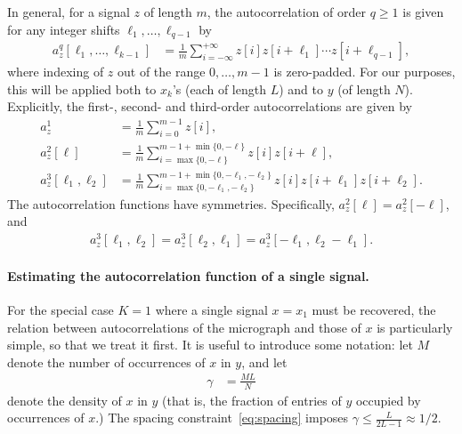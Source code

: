 \documentclass[english,11pt]{article}
\newcommand{\1}{\mathbf{1}}
\newcommand{\TODO}[1]{{\color{red}{[#1]}}}
\numberwithin{equation}{section}
\theoremstyle{plain}
\theoremstyle{definition}
\theoremstyle{remark}
\theoremstyle{plain}
\theoremstyle{remark}
\theoremstyle{plain}
\theoremstyle{plain}
\begin{document}
In general, for a signal $z$ of length $m$, the autocorrelation of order $q \geq 1$ is given for any integer shifts $\ell_1, \ldots, \ell_{q-1}$ by
\begin{align}
a_z^q[\ell_1,\ldots,\ell_{k-1}]  & = \frac{1}{m} \sum_{i=-\infty}^{+\infty} z[i]z[i+\ell_1]\cdots z[i+\ell_{q-1}],
\label{eq:ac_general}
\end{align}
where indexing of $z$ out of the range $0, \ldots, m-1$ is zero-padded.
For our purposes, this will be applied both to $x_k$'s (each of length $L$) and to $y$ (of length $N$).
Explicitly, the first-, second- and third-order autocorrelations are given by
\begin{align} 
a_z^1 & = \frac{1}{m} \sum_{i=0}^{m-1} z[i], \nonumber\\
a_z^2[\ell] & = \frac{1}{m} \sum_{i = \max\{0, -\ell\}}^{m-1 + \min\{0, -\ell\}} z[i]z[i+\ell], \nonumber\\
a_z^3[\ell_1,\ell_2] & = \frac{1}{m} \sum_{i = \max\{0, -\ell_1, -\ell_2\}}^{m-1 + \min\{0, -\ell_1, -\ell_2\}} z[i]z[i+\ell_1]z[i+\ell_2]. \label{eq:ac_special}
\end{align}
The autocorrelation functions have symmetries. Specifically, $a_z^2[\ell] = a_z^2[-\ell]$, and
\begin{align*}
a_z^3[\ell_1,\ell_2] = a_z^3[\ell_2,\ell_1]=a_z^3[-\ell_1,\ell_2-\ell_1].
\end{align*}

\paragraph{Estimating the autocorrelation function of a single signal.}

For the special case $K = 1$ where a single signal $x = x_1$ must be recovered, the relation between autocorrelations of the micrograph and those of $x$ is particularly simple, so that we treat it first. It is useful to introduce some notation: let $M$ denote the number of occurrences of $x$ in $y$, and let
\begin{align}
\gamma & = \frac{M L}{N}
\end{align}
denote the density of $x$ in $y$ (that is, the fraction of entries of $y$ occupied by occurrences of $x$.) The spacing constraint~\eqref{eq:spacing} imposes $\gamma\leq\frac{L}{2L-1}\approx 1/2$.
\end{document}
